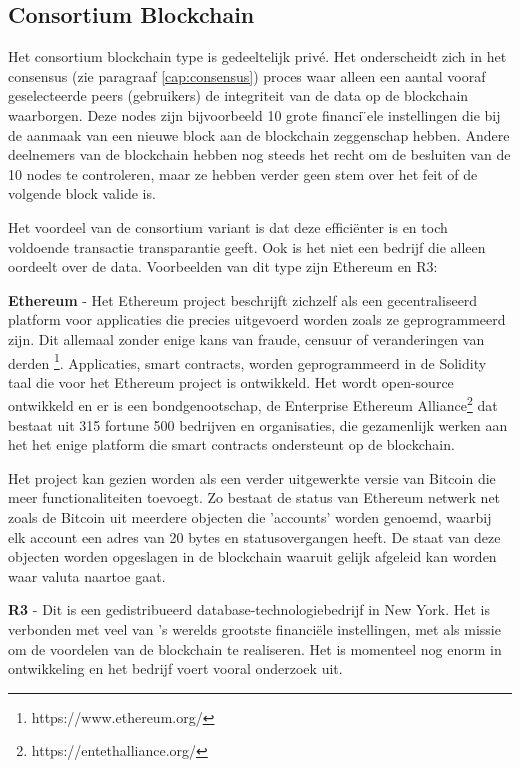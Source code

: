 \subsection{Consortium Blockchain}
Het consortium blockchain type is gedeeltelijk privé. Het onderscheidt zich in het consensus (zie paragraaf \ref{cap:consensus}) proces waar alleen een aantal vooraf geselecteerde peers (gebruikers) de integriteit van de data op de blockchain waarborgen. Deze nodes zijn bijvoorbeeld 10 grote financi ̈ele instellingen die bij de aanmaak van een nieuwe block aan de blockchain zeggenschap hebben. Andere deelnemers van de blockchain hebben nog steeds het recht om de besluiten van de 10 nodes te controleren, maar ze hebben verder geen stem over het feit of de volgende block valide is.\par
\newpage					
Het voordeel van de consortium variant is dat deze efficiënter is en toch voldoende transactie transparantie geeft. Ook is het niet een bedrijf die alleen oordeelt over de data. Voorbeelden van dit type zijn Ethereum en R3:

\textbf{Ethereum} - Het Ethereum project beschrijft zichzelf als een gecentraliseerd platform voor applicaties die precies uitgevoerd worden zoals ze geprogrammeerd zijn. Dit allemaal zonder enige kans van fraude, censuur of veranderingen van derden \footnote{https://www.ethereum.org/}. Applicaties, smart contracts, worden geprogrammeerd in de Solidity taal die voor het Ethereum project is ontwikkeld. Het wordt open-source ontwikkeld en er is een bondgenootschap, de Enterprise Ethereum Alliance\footnote{https://entethalliance.org/} dat bestaat uit 315 fortune 500 bedrijven en organisaties, die gezamenlijk werken aan het het enige platform die smart contracts ondersteunt op de blockchain.\cite{ethWood}\par

Het project kan gezien worden als een verder uitgewerkte versie van Bitcoin die meer functionaliteiten toevoegt. Zo bestaat de status van Ethereum netwerk net zoals de Bitcoin uit meerdere objecten die 'accounts' worden genoemd, waarbij elk account een adres van 20 bytes en statusovergangen heeft. De staat van deze objecten worden opgeslagen in de blockchain waaruit gelijk afgeleid kan worden waar valuta naartoe gaat.\cite{whitePaperEthereum}

\textbf{R3} - Dit is een gedistribueerd database-technologiebedrijf in New York. Het is verbonden met veel van ’s werelds grootste financiële instellingen, met als missie om de voordelen van de blockchain te realiseren. Het is momenteel nog enorm in ontwikkeling en het bedrijf voert vooral onderzoek uit\cite{R3}.

